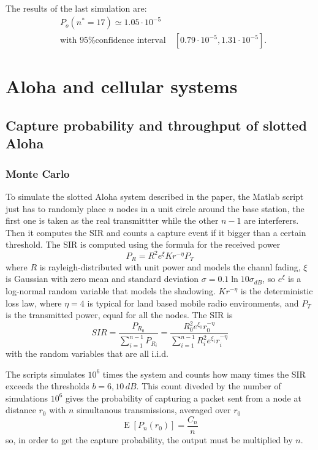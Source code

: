 \documentclass[a4paper,oneside]{article}
\renewcommand{\approx}[0]{\simeq}
\newcommand{\E}[1]{\operatorname{E}\left[#1\right]}
\begin{document}
The results of the last simulation are:
\begin{align*}
  & P_o(n^* = 17) \approx 1.05 \cdot 10^{-5} \\
  & \text{with 95\% confidence interval} \quad [0.79 \cdot 10^{-5}, 1.31 \cdot 10^{-5}] .
\end{align*}
\section{Aloha and cellular systems}
\subsection*{Capture probability and throughput of slotted Aloha}
\subsubsection*{Monte Carlo}
To simulate the slotted Aloha system described in the paper, the
Matlab script just has to randomly place $n$ nodes in a unit circle
around the base station, the first one is taken as the real
transmittter while the other $n-1$ are interferers. Then it computes
the SIR and counts a capture event if it bigger than a certain
threshold.
%
The SIR is computed using the formula for the received power
\begin{equation}
  P_R = R^2e^\xi Kr^{-\eta}P_T
\end{equation}
where $R$ is rayleigh-distributed with unit power and models the
channl fading, $\xi$ is Gaussian with zero mean and standard deviation
$\sigma = 0.1 \ln10 \sigma_{dB}$, so $e^\xi$ is a log-normal random
variable that models the shadowing. $Kr^{-\eta}$ is the deterministic
loss law, where $\eta = 4$ is typical for land based mobile radio
environments, and $P_T$ is the transmitted power, equal for all the
nodes.
%
The SIR is
\begin{equation}
  SIR = \frac{P_{R_0}}{\sum_{i=1}^{n-1} P_{R_i}} =
  \frac{R_0^2 e^{\xi_0} r_0^{-\eta}}{\sum_{i=1}^{n-1} R_i^2 e^{\xi_i} r_i^{-\eta}}
\end{equation}
with the random variables that are all i.i.d.

The scripts simulates $10^6$ times the system and counts how many
times the SIR exceeds the thresholds $b = 6, 10 \, \si{dB}$. This count
diveded by the number of simulations $10^6$ gives the probability of
capturing a packet sent from a node at distance $r_0$ with $n$
simultanous transmissions, averaged over $r_0$
\begin{equation}
  \E{P_n(r_0)} = \frac{C_n}{n}
\end{equation}
so, in order to get the capture probability, the output must be
multiplied by $n$.
\end{document}
